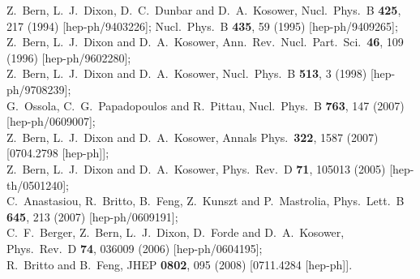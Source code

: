 \documentclass[aps,prd,preprint,groupedaddress,nofootinbib,showpacs,eqsecnum]{revtex4}
\begin{document}
\begin{thebibliography}{99}

Z.~Bern, L.~J.~Dixon, D.~C.~Dunbar and D.~A.~Kosower,
Nucl.\ Phys.\ B {\bf 425}, 217 (1994)
[hep-ph/9403226];
%
Nucl.\ Phys.\ B {\bf 435}, 59 (1995)
[hep-ph/9409265];\\
Z.\ Bern, L.\ J.\ Dixon and D.\ A.\ Kosower,
Ann.\ Rev.\ Nucl.\ Part.\ Sci.\  {\bf 46}, 109 (1996)
[hep-ph/9602280];\\
Z.~Bern, L.~J.~Dixon and D.~A.~Kosower,
Nucl.\ Phys.\  B {\bf 513}, 3 (1998)
[hep-ph/9708239];\\
G.~Ossola, C.~G.~Papadopoulos and R.~Pittau,
Nucl.\ Phys.\  B {\bf 763}, 147 (2007)
[hep-ph/0609007];\\
Z.~Bern, L.~J.~Dixon and D.~A.~Kosower,
Annals Phys.\  {\bf 322}, 1587 (2007)
[0704.2798 [hep-ph]];\\
Z.~Bern, L.~J.~Dixon and D.~A.~Kosower,
Phys.\ Rev.\  D {\bf 71}, 105013 (2005)
[hep-th/0501240];\\
C.~Anastasiou, R.~Britto, B.~Feng, Z.~Kunszt and P.~Mastrolia,
Phys.\ Lett.\  B {\bf 645}, 213 (2007)
[hep-ph/0609191];\\
C.~F.~Berger, Z.~Bern, L.~J.~Dixon, D.~Forde and D.~A.~Kosower,
Phys.\ Rev.\ D {\bf 74}, 036009 (2006)
[hep-ph/0604195];\\
R.~Britto and B.~Feng,
JHEP {\bf 0802}, 095 (2008)
[0711.4284 [hep-ph]].


\end{thebibliography}
\end{document}
